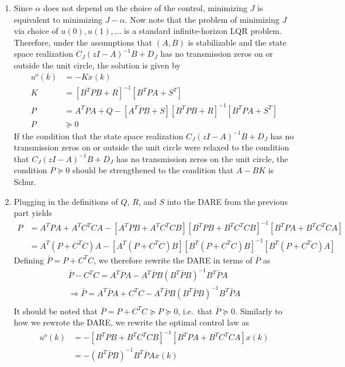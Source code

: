 \begin{enumerate}
    \item
    Since $\alpha$ does not depend on the choice of the control, minimizing $J$ is equivalent to minimizing $J - \alpha$. Now note that the problem of minimizing $J$ via choice of $u(0),u(1),\ldots$ is a standard infinite-horizon LQR problem. Therefore, under the assumptions that $(A,B)$ is stabilizable and the state space realization $C_J(zI-A)^{-1} B + D_J$ has no transmission zeros on or outside the unit circle, the solution is given by
    \begin{align*}
        u^o(k) & = -Kx(k) \\
        K & = [B^T PB + R]^{-1} [B^T PA + S^T] \\
        P & = A^T PA + Q - [A^T PB + S] [B^T PB + R]^{-1} [B^T PA + S^T] \\
        P & \succeq 0
    \end{align*}
    If the condition that the state space realization $C_J(zI-A)^{-1} B + D_J$ has no transmission zeros on or outside the unit circle were relaxed to the condition that $C_J(zI-A)^{-1} B + D_J$ has no transmission zeros on the unit circle, the condition $P \succeq 0$ should be strengthened to the condition that $A-BK$ is Schur.

    \item
    Plugging in the definitions of $Q$, $R$, and $S$ into the DARE from the previous part yields
    \begin{align*}
        P & = A^T PA + A^T C^T CA - [A^T PB + A^T C^T CB] [B^T PB + B^T C^T CB]^{-1} 
            [B^T PA + B^T C^T CA] \\
        & = A^T (P + C^T C) A - [A^T (P + C^T C) B][B^T (P + C^T C) B]^{-1} [B^T (P + C^T C) A]
    \end{align*}
    Defining $\bar{P} = P + C^T C$, we therefore rewrite the DARE in terms of $\bar{P}$ as
    \begin{gather*}
        \bar{P} - C^T C = A^T \bar{P} A - A^T \bar{P} B (B^T \bar{P} B)^{-1} B^T \bar{P} A \\
        \Rightarrow \bar{P} = A^T \bar{P} A + C^T C - A^T \bar{P} B (B^T \bar{P} B)^{-1} B^T \bar{P} A \\
    \end{gather*}
    It should be noted that $\bar{P} = P + C^T C \succeq P \succeq 0$, i.e.\ that $\bar{P} \succeq 0$. Similarly to how we rewrote the DARE, we rewrite the optimal control law as
    \begin{align*}
        u^o(k) & = -[B^T PB + B^T C^T CB]^{-1} [B^T P A + B^T C^T CA] x(k) \\
        & = -(B^T \bar{P}B)^{-1} B^T \bar{P}A x(k)
    \end{align*}

\end{enumerate} 